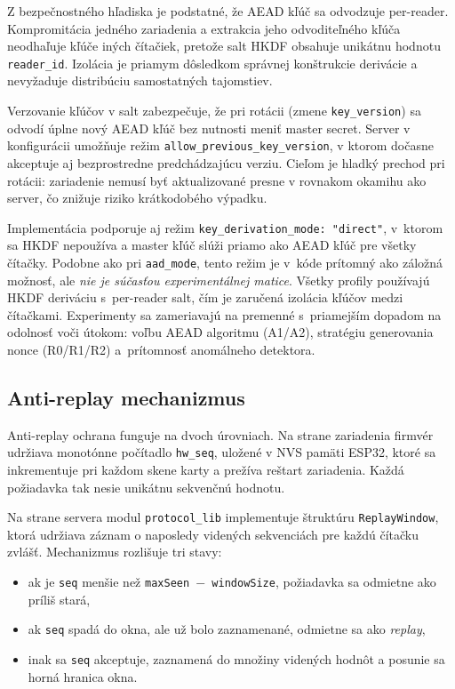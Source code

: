 \documentclass[journal,a4paper,onecolumn]{IEEEtran}
\begin{document}
Z bezpečnostného hľadiska je podstatné, že AEAD kľúč sa odvodzuje per-reader. Kompromitácia jedného zariadenia a extrakcia jeho odvoditeľného kľúča neodhaľuje kľúče iných čítačiek, pretože salt HKDF obsahuje unikátnu hodnotu \texttt{reader\_id}. Izolácia je priamym dôsledkom správnej konštrukcie derivácie a nevyžaduje distribúciu samostatných tajomstiev.

Verzovanie kľúčov v salt zabezpečuje, že pri rotácii (zmene \texttt{key\_version}) sa odvodí úplne nový AEAD kľúč bez nutnosti meniť master secret. Server v konfigurácii umožňuje režim \texttt{allow\_previous\_key\_version}, v ktorom dočasne akceptuje aj bezprostredne predchádzajúcu verziu. Cieľom je hladký prechod pri rotácii: zariadenie nemusí byť aktualizované presne v rovnakom okamihu ako server, čo znižuje riziko krátkodobého výpadku\cite{NIST80057}.

Implementácia podporuje aj režim \texttt{key\_derivation\_mode: "direct"}, v~ktorom sa HKDF nepoužíva a master kľúč slúži priamo ako AEAD kľúč pre všetky čítačky. Podobne ako pri \texttt{aad\_mode}, tento režim je v~kóde prítomný ako záložná možnosť, ale \emph{nie je súčasťou experimentálnej matice}. Všetky profily používajú HKDF deriváciu s~per-reader salt, čím je zaručená izolácia kľúčov medzi čítačkami. Experimenty sa zameriavajú na premenné s~priamejším dopadom na odolnosť voči útokom: voľbu AEAD algoritmu (A1/A2), stratégiu generovania nonce (R0/R1/R2) a~prítomnosť anomálneho detektora.

\subsection{Anti-replay mechanizmus}

Anti-replay ochrana funguje na dvoch úrovniach. Na strane zariadenia firmvér udržiava monotónne počítadlo \texttt{hw\_seq}, uložené v NVS pamäti ESP32, ktoré sa inkrementuje pri každom skene karty a prežíva reštart zariadenia. Každá požiadavka tak nesie unikátnu sekvenčnú hodnotu.

Na strane servera modul \texttt{protocol\_lib} implementuje štruktúru \texttt{ReplayWindow}, ktorá udržiava záznam o naposledy videných sekvenciách pre každú čítačku zvlášť. Mechanizmus rozlišuje tri stavy:

\begin{itemize}[leftmargin=*,itemsep=2pt]
  \item ak je \texttt{seq} menšie než \texttt{maxSeen $-$ windowSize}, požiadavka sa odmietne ako príliš stará,
  \item ak \texttt{seq} spadá do okna, ale už bolo zaznamenané, odmietne sa ako \emph{replay},
  \item inak sa \texttt{seq} akceptuje, zaznamená do množiny videných hodnôt a posunie sa horná hranica okna.
\end{itemize}
\end{document}
